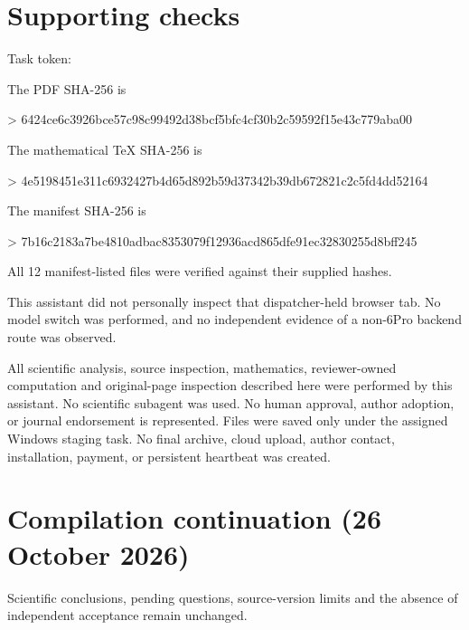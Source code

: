 \documentclass[10pt]{article}
\begin{document}
\section*{Supporting checks}
Task token:\par
The PDF SHA-256 is\par
> 6424ce6c3926bce57c98c99492d38bcf5bfc4cf30b2c59592f15e43c779aba00\par
The mathematical TeX SHA-256 is\par
> 4e5198451e311c6932427b4d65d892b59d37342b39db672821c2c5fd4dd52164\par
The manifest SHA-256 is\par
> 7b16c2183a7be4810adbac8353079f12936acd865dfe91ec32830255d8bff245\par
All 12 manifest-listed files were verified against their supplied hashes.\par
This assistant did not personally inspect that dispatcher-held browser tab. No model switch was performed, and no independent evidence of a non-6Pro backend route was observed.\par
All scientific analysis, source inspection, mathematics, reviewer-owned computation and original-page inspection described here were performed by this assistant. No scientific subagent was used. No human approval, author adoption, or journal endorsement is represented. Files were saved only under the assigned Windows staging task. No final archive, cloud upload, author contact, installation, payment, or persistent heartbeat was created.\par
\section*{Compilation continuation (26 October 2026)}
Scientific conclusions, pending questions, source-version limits and the absence of independent acceptance remain unchanged.\par
\end{document}
